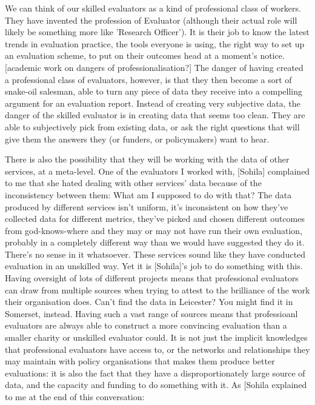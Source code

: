 We can think of our skilled evaluators as a kind of professional class of workers. They have invented the profession of Evaluator (although their actual role will likely be something more like 'Research Officer'). It is their job to know the latest trends in evaluation practice, the tools everyone is using, the right way to set up an evaluation scheme, to put on their outcomes head at a moment's notice. [academic work on dangers of professionalisation?] The danger of having created a professional class of evaluators, however, is that they then become a sort of snake-oil salesman, able to turn any piece of data they receive into a compelling argument for an evaluation report. Instead of creating very subjective data, the danger of the skilled evaluator is in creating data that seems too clean. They are able to subjectively pick from existing data, or ask the right questions that will give them the answers they (or funders, or policymakers) want to hear.

There is also the possibility that they will be working with the data of other services, at a meta-level. One of the evaluators I worked with, [Sohila] complained to me that she hated dealing with other services' data because of the inconsistency between them:
What am I supposed to do with that? The data produced by different services isn't uniform, it's inconsistent on how they've collected data for different metrics, they've picked and chosen different outcomes from god-knows-where and they may or may not have run their own evaluation, probably in a completely different way than we would have suggested they do it. There's no sense in it whatsoever.
These services sound like they have conducted evaluation in an unskilled way. Yet it is [Sohila]'s job to do something with this. Having oversight of lots of different projects means that professional evaluators can draw from multiple sources when trying to attest to the brilliance of the work their organisation does. Can't find the data in Leicester? You might find it in Somerset, instead. Having such a vast range of sources means that professioanl evaluators are always able to construct a more convincing evaluation than a smaller charity or unskilled evaluator could. It is not just the implicit knowledges that professional evaluators have access to, or the networks and relationships they may maintain with policy organisations that makes them produce better evaluations: it is also the fact that they have a disproportionately large source of data, and the capacity and funding to do something with it. As [Sohila explained to me at the end of this conversation:

